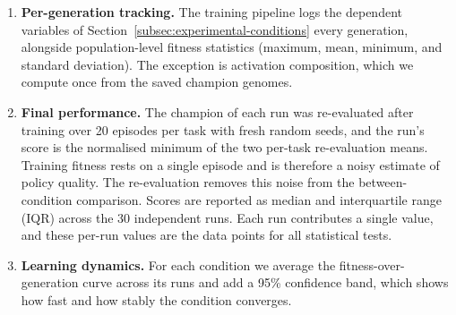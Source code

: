 \documentclass[12pt]{article}
\begin{document}
\begin{enumerate}
    \item \textbf{Per-generation tracking.} The training pipeline logs the dependent variables of Section~\ref{subsec:experimental-conditions} every generation, alongside population-level fitness statistics (maximum, mean, minimum, and standard deviation). The exception is activation composition, which we compute once from the saved champion genomes.
    \item \textbf{Final performance.} The champion of each run was re-evaluated after training over 20 episodes per task with fresh random seeds, and the run's score is the normalised minimum of the two per-task re-evaluation means. Training fitness rests on a single episode and is therefore a noisy estimate of policy quality. The re-evaluation removes this noise from the between-condition comparison. Scores are reported as median and interquartile range (IQR) across the 30 independent runs. Each run contributes a single value, and these per-run values are the data points for all statistical tests.
    \item \textbf{Learning dynamics.} For each condition we average the fitness-over-generation curve across its runs and add a 95\% confidence band, which shows how fast and how stably the condition converges.
\end{enumerate}
\end{document}
